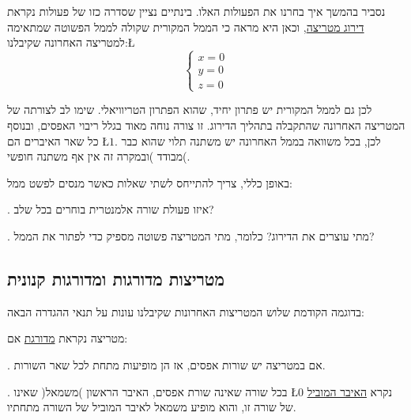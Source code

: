 \begin{example}
נסביר בהמשך איך בחרנו את הפעולות האלו. בינתיים נציין שסדרה כזו של
פעולות נקראת \uline{דירוג מטריצה}, וכאן היא מראה כי הממ\textquotedbl ל
המקורית שקולה לממ\textquotedbl ל הפשוטה שמתאימה למטריצה האחרונה שקיבלנו:\L{%
\[
\begin{cases}
x=0\\
y=0\\
z=0
\end{cases}
\]
}%

לכן גם לממ\textquotedbl ל המקורית יש פתרון יחיד, שהוא הפתרון הטריוויאלי.
שימו לב לצורתה של המטריצה האחרונה שהתקבלה בתהליך הדירוג. זו צורה נוחה
מאוד בגלל ריבוי האפסים, ובנוסף כל שאר האיברים הם \L{$1$}. לכן, בכל
משוואה בממ\textquotedbl ל האחרונה יש משתנה תלוי שהוא כבר מבודד )ובמקרה
זה אין אף משתנה חופשי(.
\end{example}

באופן כללי, צריך להתייחס לשתי שאלות כאשר מנסים לפשט ממ\textquotedbl ל:

{\endL}. איזו פעולת שורה אלמנטרית בוחרים בכל שלב?

{\endL}. מתי עוצרים את הדירוג? כלומר, מתי המטריצה פשוטה מספיק
כדי לפתור את הממ\textquotedbl ל?

\subsection{מטריצות מדורגות ומדורגות קנונית}

בדוגמה הקודמת שלוש המטריצות האחרונות שקיבלנו עונות על תנאי ההגדרה
הבאה:

\begin{hdef}
מטריצה נקראת \uline{מדורגת} אם:

{\endL}. אם במטריצה יש שורות אפסים, אז הן מופיעות מתחת לכל
שאר השורות.

{\endL}. בכל שורה שאינה שורת אפסים, האיבר הראשון )משמאל(
שאינו \L{$0$} נקרא \uline{האיבר המוביל} של שורה זו, והוא מופיע משמאל
לאיבר המוביל של השורה מתחתיו.
\end{hdef}

